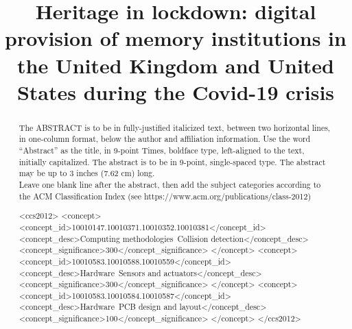 \documentclass{egpubl}
\title[Heritage in lockdown: digital provision of memory institutions during the Covid-19 crisis]%
      {Heritage in lockdown: digital provision of memory institutions in the United Kingdom and United States during the Covid-19 crisis}
\begin{document}

\maketitle
\begin{abstract}
   The ABSTRACT is to be in fully-justified italicized text, 
   between two horizontal lines,
   in one-column format, 
   below the author and affiliation information. 
   Use the word ``Abstract'' as the title, in 9-point Times, boldface type, 
   left-aligned to the text, initially capitalized. 
   The abstract is to be in 9-point, single-spaced type.
   The abstract may be up to 3 inches (7.62 cm) long. \\
   Leave one blank line after the abstract, 
   then add the subject categories according to the ACM Classification Index 
   (see https://www.acm.org/publications/class-2012)
\begin{CCSXML}
<ccs2012>
<concept>
<concept_id>10010147.10010371.10010352.10010381</concept_id>
<concept_desc>Computing methodologies~Collision detection</concept_desc>
<concept_significance>300</concept_significance>
</concept>
<concept>
<concept_id>10010583.10010588.10010559</concept_id>
<concept_desc>Hardware~Sensors and actuators</concept_desc>
<concept_significance>300</concept_significance>
</concept>
<concept>
<concept_id>10010583.10010584.10010587</concept_id>
<concept_desc>Hardware~PCB design and layout</concept_desc>
<concept_significance>100</concept_significance>
</concept>
</ccs2012>
\end{CCSXML}



\printccsdesc   
\end{abstract}  
\end{document}
